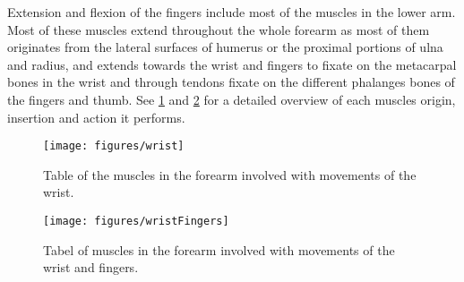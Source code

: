 Extension and flexion of the fingers include most of the muscles in the lower arm. Most of these muscles extend throughout the whole forearm as most of them originates from the lateral surfaces of humerus or the proximal portions of ulna and radius, and extends towards the wrist and fingers to fixate on the metacarpal bones in the wrist and through tendons fixate on the different phalanges bones of the fingers and thumb. See \ref{fig:wrist} and \ref{fig:wristFingers} for a detailed overview of each muscles origin, insertion and action it performs. 

\begin{figure}[H]
	\texttt{[image: figures/wrist]}  %
	\caption{Table of the muscles in the forearm involved with movements of the wrist. \cite{martini}}
	\label{fig:wrist}  %
\end{figure}

\begin{figure}[H]                    
	\texttt{[image: figures/wristFingers]}  %
	\caption{Tabel of muscles in the forearm involved with movements of the wrist and fingers. \cite{martini}}
	\label{fig:wristFingers}  %
\end{figure}










